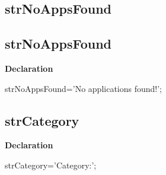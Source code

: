 \documentclass{report}
\newif\ifpdf
\begin{document}
\subsection*{\large{\textbf{strNoAppsFound}}\normalsize\hspace{1ex}\hrulefill}
\else
\subsection*{strNoAppsFound}
\fi
\label{trstrings-strNoAppsFound}
\begin{list}{}{
\setlength{\itemindent}{0cm}
\setlength{\listparindent}{0cm}
\setlength{\leftmargin}{\evensidemargin}
\addtolength{\leftmargin}{\tmplength}
\settowidth{\labelsep}{X}
\addtolength{\leftmargin}{\labelsep}
\setlength{\labelwidth}{\tmplength}
}
\item[\textbf{Declaration}\hfill]
\ifpdf
\begin{flushleft}
\fi
\begin{ttfamily}
strNoAppsFound='No applications found!';\end{ttfamily}

\ifpdf
\end{flushleft}
\fi

\end{list}
\ifpdf
\subsection*{\large{\textbf{strCategory}}\normalsize\hspace{1ex}\hrulefill}
\else
\subsection*{strCategory}
\fi
\label{trstrings-strCategory}
\begin{list}{}{
\setlength{\itemindent}{0cm}
\setlength{\listparindent}{0cm}
\setlength{\leftmargin}{\evensidemargin}
\addtolength{\leftmargin}{\tmplength}
\settowidth{\labelsep}{X}
\addtolength{\leftmargin}{\labelsep}
\setlength{\labelwidth}{\tmplength}
}
\item[\textbf{Declaration}\hfill]
\ifpdf
\begin{flushleft}
\fi
\begin{ttfamily}
strCategory='Category:';\end{ttfamily}

\ifpdf
\end{flushleft}
\fi

\end{list}
\ifpdf
\end{document}
